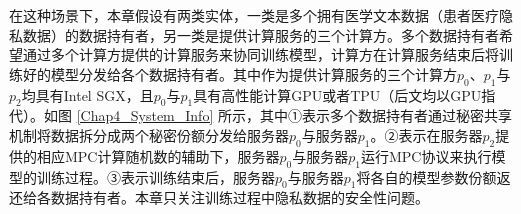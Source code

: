 


在这种场景下，本章假设有两类实体，一类是多个拥有医学文本数据（患者医疗隐私数据）的数据持有者，另一类是提供计算服务的三个计算方。多个数据持有者希望通过多个计算方提供的计算服务来协同训练模型，计算方在计算服务结束后将训练好的模型分发给各个数据持有者。其中作为提供计算服务的三个计算方$p_0$、$p_1$与$p_2$均具有Intel SGX，且$p_0$与$p_1$具有高性能计算GPU或者TPU（后文均以GPU指代）。如图 \ref{Chap4_System_Info} 所示，其中①表示多个数据持有者通过秘密共享机制\cite{SecretSharingAS, Shamir_SS}将数据拆分成两个秘密份额分发给服务器$p_0$与服务器$p_1$。②表示在服务器$p_2$提供的相应MPC计算随机数的辅助下，服务器$p_0$与服务器$p_1$运行MPC协议来执行模型的训练过程。③表示训练结束后，服务器$p_0$与服务器$p_1$将各自的模型参数份额返还给各数据持有者。本章只关注训练过程中隐私数据的安全性问题。

%

